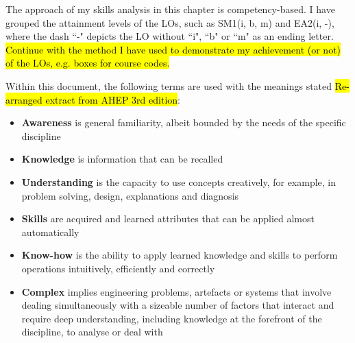 The approach of my skills analysis in this chapter is competency-based.
I have grouped the attainment levels of the LOs, such as SM1(i, b, m) and EA2(i, -), where the dash ``-" depicts the LO without ``i", ``b" or ``m" as an ending letter.
\hl{Continue with the method I have used to demonstrate my achievement (or not) of the LOs, e.g. boxes for course codes.}

Within this document, the following terms are used with the meanings stated \hl{Re-arranged extract from AHEP 3rd edition}:
\begin{itemize}
    \item \textbf{Awareness} is general familiarity, albeit bounded by the needs of the specific discipline

    \item \textbf{Knowledge} is information that can be recalled

    \item \textbf{Understanding} is the capacity to use concepts creatively, for example, in problem solving, design, explanations and diagnosis

    \item \textbf{Skills} are acquired and learned attributes that can be applied almost automatically

    \item \textbf{Know-how} is the ability to apply learned knowledge and skills to perform operations intuitively, efficiently and correctly

    \item \textbf{Complex} implies engineering problems, artefacts or systems that involve dealing simultaneously with a sizeable number of factors that interact and require deep understanding, including knowledge at the forefront of the discipline, to analyse or deal with

\end{itemize}



